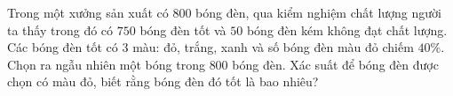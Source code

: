\begin{ex}%
	Trong một xưởng sản xuất có $800$ bóng đèn, qua kiểm nghiệm chất lượng người ta thấy trong đó có $750$ bóng đèn tốt và $50$ bóng đèn kém không đạt chất lượng. Các bóng đèn tốt có $3$ màu: đỏ, trắng, xanh và số bóng đèn màu đỏ chiếm $40\%$. Chọn ra ngẫu nhiên một bóng trong $800$ bóng đèn. Xác suất để bóng đèn được chọn có màu đỏ, biết rằng bóng đèn đó tốt là bao nhiêu?
\end{ex}

